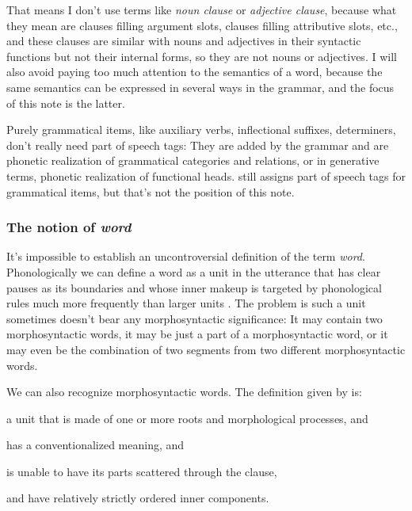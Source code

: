 \documentclass[UTF8, a4paper, oneside, scheme=plain]{ctexrep}
\newcommand*{\citesec}[1]{\S~{#1}}
\newcommand*{\term}[1]{\emph{#1}}
\begin{document}
That means I don't use terms like \term{noun clause} or \term{adjective clause},
because what they mean are clauses filling argument slots, 
clauses filling attributive slots, etc.,
and these clauses are similar with nouns and adjectives in their syntactic functions 
but not their internal forms,
so they are not nouns or adjectives.
I will also avoid paying too much attention to the semantics of a word,
because the same semantics can be expressed in several ways in the grammar,
and the focus of this note is the latter.

Purely grammatical items, like auxiliary verbs, inflectional suffixes, determiners,
don't really need part of speech tags:
They are added by the grammar and are phonetic realization of grammatical categories and relations,
or in generative terms, phonetic realization of functional heads.
\citet{cgel} still assigns part of speech tags for grammatical items,
but that's not the position of this note.

\subsubsection{The notion of \term{word}}\label{sec:wordhood}

It's impossible to establish an uncontroversial definition of the term \term{word}.
Phonologically we can define a word as a unit in the utterance
that has clear pauses as its boundaries and 
whose inner makeup is targeted by phonological rules much more frequently
than larger units \citep[\citesec{10.3}]{dixon2010basic2}.
The problem is such a unit sometimes doesn't bear any morphosyntactic significance:
It may contain two morphosyntactic words,
it may be just a part of a morphosyntactic word,
or it may even be the combination of two segments from two different morphosyntactic words.

We can also recognize morphosyntactic words. 
The definition given by \citep[\citesec{10.4}]{dixon2010basic2} is:
\begin{enumerate*}
    \item a unit that is made of one or more roots and morphological processes, and
    \item has a conventionalized meaning, and
    \item is unable to have its parts scattered through the clause,
    \item and have relatively strictly ordered inner components.
\end{enumerate*}
\end{document}
